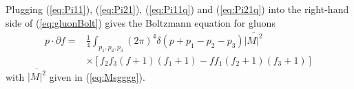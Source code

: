 \documentclass[onecolumn,showpacs,nobibnotes,nofootinbib,12pt,aps,prd,showpacs,notitlepage,nofootinbib,preprintnumbers,amsmath,amssymb]{article}
\begin{document}
Plugging (\ref{eq:Pi11}), (\ref{eq:Pi21}), (\ref{eq:Pi11q}) and
(\ref{eq:Pi21q}) into the right-hand side of
(\ref{eq:gluonBolt}) gives the Boltzmann equation for gluons
\begin{align}
  p\cdot \partial f =&\frac{1}{4}\int_{p_1,p_2,p_3} (2\pi)^4\delta(p+p_1-p_2-p_3)\overline{|M|^2}\nonumber\\
  &\times[f_2f_3(f+1)(f_1+1)-ff_1(f_2+1)(f_3+1)]
\end{align}
with $\overline{|M|^2}$ given in (\ref{eq:Msgggg}).


% 
% 

\end{document}
